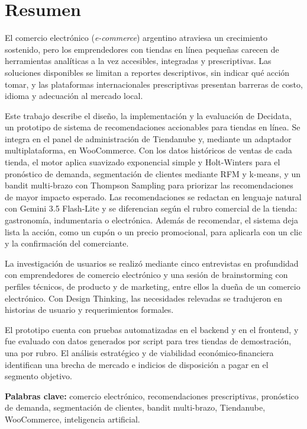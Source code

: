 \chapter*{Resumen}

El comercio electrónico (\emph{e-commerce}) argentino atraviesa un crecimiento sostenido, pero los emprendedores con tiendas en línea pequeñas carecen de herramientas analíticas a la vez accesibles, integradas y prescriptivas. Las soluciones disponibles se limitan a reportes descriptivos, sin indicar qué acción tomar, y las plataformas internacionales prescriptivas presentan barreras de costo, idioma y adecuación al mercado local.

Este trabajo describe el diseño, la implementación y la evaluación de Decidata, un prototipo de sistema de recomendaciones accionables para tiendas en línea. Se integra en el panel de administración de Tiendanube y, mediante un adaptador multiplataforma, en WooCommerce. Con los datos históricos de ventas de cada tienda, el motor aplica suavizado exponencial simple y Holt-Winters para el pronóstico de demanda, segmentación de clientes mediante RFM y k-means, y un bandit multi-brazo con Thompson Sampling para priorizar las recomendaciones de mayor impacto esperado. Las recomendaciones se redactan en lenguaje natural con Gemini 3.5 Flash-Lite y se diferencian según el rubro comercial de la tienda: gastronomía, indumentaria o electrónica.
Además de recomendar, el sistema deja lista la acción, como un cupón o un precio promocional, para aplicarla con un clic y la confirmación del comerciante.

La investigación de usuarios se realizó mediante cinco entrevistas en profundidad con emprendedores de comercio electrónico y una sesión de brainstorming con perfiles técnicos, de producto y de marketing, entre ellos la dueña de un comercio electrónico. Con Design Thinking, las necesidades relevadas se tradujeron en historias de usuario y requerimientos formales.

El prototipo cuenta con pruebas automatizadas en el backend y en el frontend, y fue evaluado con datos generados por script para tres tiendas de demostración, una por rubro. El análisis estratégico y de viabilidad económico-financiera identifican una brecha de mercado e indicios de disposición a pagar en el segmento objetivo.

\bigskip
\noindent\textbf{Palabras clave:} comercio electrónico, recomendaciones prescriptivas, pronóstico de demanda, segmentación de clientes, bandit multi-brazo, Tiendanube, WooCommerce, inteligencia artificial.
